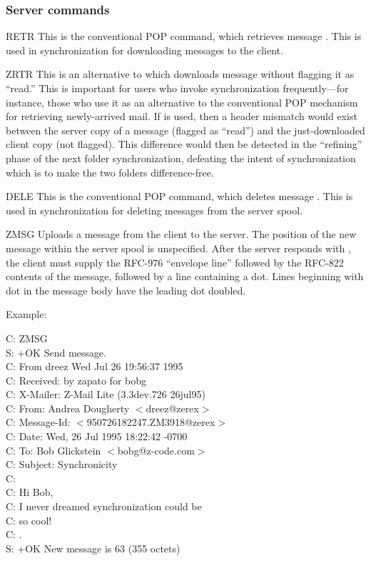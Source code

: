 \subsubsection{Server commands}

\begin{codelist}
\item[RETR \var{m}] This is the conventional POP  command,
which retrieves message .  This is used in synchronization for
downloading messages to the client.

\item[ZRTR \var{m}] This is an alternative to  which
downloads message  without flagging it as ``read.''  This is
important for users who invoke synchronization frequently---for
instance, those who use it as an alternative to the conventional POP
mechanism for retrieving newly-arrived mail.  If  is used,
then a header mismatch would exist between the server copy of a
message (flagged as ``read'') and the just-downloaded client copy (not
flagged).  This difference would then be detected in the ``refining''
phase of the next folder synchronization, defeating the intent of
synchronization which is to make the two folders difference-free.

\item[DELE \var{m}] This is the conventional POP  command,
which deletes message .  This is used in synchronization for
deleting messages from the server spool.

\item[ZMSG] Uploads a message from the client to the server.  The
position of the new message within the server spool is unspecified.
After the server responds with , the client must supply the
RFC-976 ``envelope  line'' followed by the RFC-822
contents of the message, followed by a line containing a dot.  Lines
beginning with dot in the message body have the leading dot doubled.

Example:

\begin{conversation}
C: ZMSG \\
S: +OK Send message. \\
C: From dreez  Wed Jul 26 19:56:37 1995 \\
C: Received: by zapato for bobg \\
C: X-Mailer: Z-Mail Lite (3.3dev.726 26jul95) \\
C: From: Andrea Dougherty $<$dreez@zerex$>$ \\
C: Message-Id: $<$950726182247.ZM3918@zerex$>$ \\
C: Date: Wed, 26 Jul 1995 18:22:42 -0700 \\
C: To: Bob Glickstein $<$bobg@z-code.com$>$ \\
C: Subject: Synchronicity \\
C: \\
C: Hi Bob, \\
C: I never dreamed synchronization could be \\
C: so cool! \\
C: . \\
S: +OK New message is 63 (355 octets)
\end{conversation}


\end{codelist}
